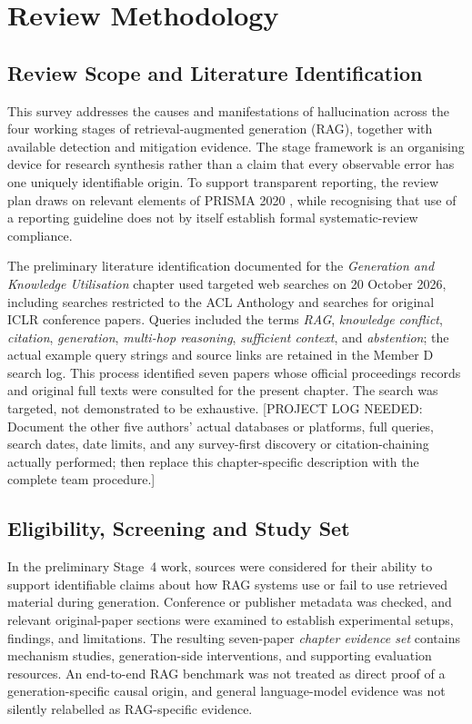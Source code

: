 \section{Review Methodology}
\label{sec:review-methodology}

\subsection{Review Scope and Literature Identification}
This survey addresses the causes and manifestations of hallucination across the four working stages of retrieval-augmented generation (RAG), together with available detection and mitigation evidence. The stage framework is an organising device for research synthesis rather than a claim that every observable error has one uniquely identifiable origin. To support transparent reporting, the review plan draws on relevant elements of PRISMA 2020 \cite{page2021prisma}, while recognising that use of a reporting guideline does not by itself establish formal systematic-review compliance.

The preliminary literature identification documented for the \emph{Generation and Knowledge Utilisation} chapter used targeted web searches on 20 October 2026, including searches restricted to the ACL Anthology and searches for original ICLR conference papers. Queries included the terms \emph{RAG}, \emph{knowledge conflict}, \emph{citation}, \emph{generation}, \emph{multi-hop reasoning}, \emph{sufficient context}, and \emph{abstention}; the actual example query strings and source links are retained in the Member D search log. This process identified seven papers whose official proceedings records and original full texts were consulted for the present chapter. The search was targeted, not demonstrated to be exhaustive. [PROJECT LOG NEEDED: Document the other five authors' actual databases or platforms, full queries, search dates, date limits, and any survey-first discovery or citation-chaining actually performed; then replace this chapter-specific description with the complete team procedure.]

\subsection{Eligibility, Screening and Study Set}
In the preliminary Stage~4 work, sources were considered for their ability to support identifiable claims about how RAG systems use or fail to use retrieved material during generation. Conference or publisher metadata was checked, and relevant original-paper sections were examined to establish experimental setups, findings, and limitations. The resulting seven-paper \emph{chapter evidence set} contains mechanism studies, generation-side interventions, and supporting evaluation resources. An end-to-end RAG benchmark was not treated as direct proof of a generation-specific causal origin, and general language-model evidence was not silently relabelled as RAG-specific evidence.

